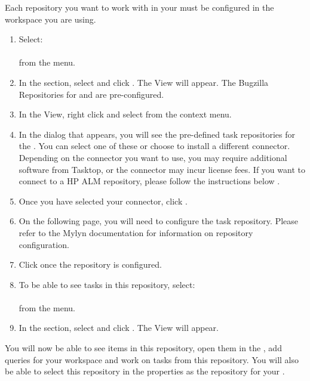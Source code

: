 Each repository you want to work with in your \ite{} must be configured in the workspace you are using. 

\begin{enumerate}
\item Select:\\ \\ from the menu.
\item In the  section, select  and click . The  View will appear. The Bugzilla Repositories for \gd{} and \jb{} are pre-configured.
\item In the  View, right click and select  from the context menu.
\item In the dialog that appears, you will see the pre-defined task repositories for the \ite{}. You can select one of these or choose to install a different connector. Depending on the connector you want to use, you may require additional software from Tasktop, or the connector may incur license fees. If you want to connect to a HP ALM repository, please follow the instructions below .
\item Once you have selected your connector, click .
\item On the following page, you will need to configure the task repository. Please refer to the Mylyn documentation for information on repository configuration. 
\item Click  once the repository is configured.
\item To be able to see tasks in this repository, select: \\ \\ from the menu. 
\item In the  section, select  and click . The  View will appear.
\end{enumerate}

You will now be able to see items in this repository, open them in the \ite{}, add queries for your workspace and work on tasks from this repository. 
You will also be able to select this repository in the \gdproject{} properties as the repository for your \gdproject{} . 

